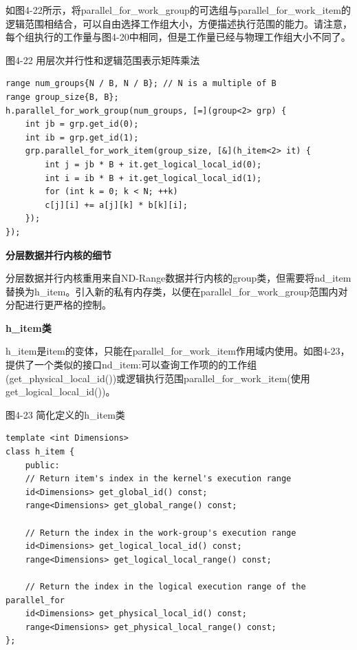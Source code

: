 如图4-22所示，将parallel\_for\_work\_group的可选组与parallel\_for\_work\_item的逻辑范围相结合，可以自由选择工作组大小，方便描述执行范围的能力。请注意，每个组执行的工作量与图4-20中相同，但是工作量已经与物理工作组大小不同了。\par

\hspace*{\fill} \par %
图4-22 用层次并行性和逻辑范围表示矩阵乘法
\begin{lstlisting}[caption={}]
range num_groups{N / B, N / B}; // N is a multiple of B
range group_size{B, B};
h.parallel_for_work_group(num_groups, [=](group<2> grp) {
	int jb = grp.get_id(0);
	int ib = grp.get_id(1);
	grp.parallel_for_work_item(group_size, [&](h_item<2> it) {
		int j = jb * B + it.get_logical_local_id(0);
		int i = ib * B + it.get_logical_local_id(1);
		for (int k = 0; k < N; ++k)
		c[j][i] += a[j][k] * b[k][i];
	});
});
\end{lstlisting}

\hspace*{\fill} \par %
\textbf{分层数据并行内核的细节}

分层数据并行内核重用来自ND-Range数据并行内核的group类，但需要将nd\_item替换为h\_item。引入新的私有内存类，以便在parallel\_for\_work\_group范围内对分配进行更严格的控制。\par

\hspace*{\fill} \par %
\textbf{h\_item类}

h\_item是item的变体，只能在parallel\_for\_work\_item作用域内使用。如图4-23，提供了一个类似的接口nd\_item:可以查询工作项的的工作组(get\_physical\_local\_id())或逻辑执行范围parallel\_for\_work\_item(使用get\_logical\_local\_id())。\par

\hspace*{\fill} \par %
图4-23 简化定义的h\_item类
\begin{lstlisting}[caption={}]
template <int Dimensions>
class h_item {
	public:
	// Return item's index in the kernel's execution range
	id<Dimensions> get_global_id() const;
	range<Dimensions> get_global_range() const;
	
	// Return the index in the work-group's execution range
	id<Dimensions> get_logical_local_id() const;
	range<Dimensions> get_logical_local_range() const;
	
	// Return the index in the logical execution range of the parallel_for
	id<Dimensions> get_physical_local_id() const;
	range<Dimensions> get_physical_local_range() const;
};
\end{lstlisting}

